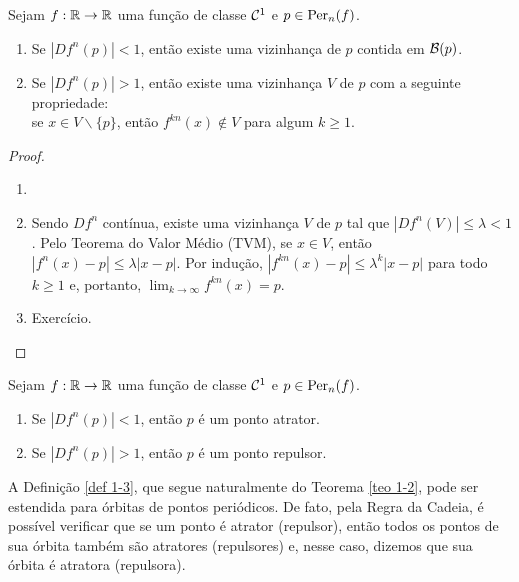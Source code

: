 \begin{theorem}\label{teo 1-2}
Sejam $f: \mathbb{R} \to \mathbb{R}$ uma função de classe $\mathcal{C}^1$ e $p \in \operatorname{Per}_n(f)$.
\begin{enumerate}
\item Se $|D f^n(p)| < 1$, então existe uma vizinhança de $p$ contida em $\mathcal{B}(p)$.
\item Se $|D f^n(p)| > 1$, então existe uma vizinhança $V$ de $p$ com a seguinte propriedade:\\se $x \in V \backslash \lbrace p \rbrace$, então  $f^{kn}(x) \notin V$ para algum $k \geq 1$. 
\end{enumerate}
\end{theorem}

\begin{proof}
\begin{enumerate}\item[]
\item Sendo $D f^n$ contínua, existe uma vizinhança $V$ de $p$ tal que $|D f^n(V)| \leq \lambda < 1$.
Pelo Teorema do Valor Médio (TVM), se $x \in V$, então $|f^n(x) - p| \leq \lambda|x - p|$.
Por indução, $|f^{kn}(x) - p| \leq \lambda^k|x - p|$ para todo $k \geq 1$ e, portanto, $\lim_{k \to \infty} f^{kn}(x) = p$.
\item Exercício.
\end{enumerate}
\end{proof}



\begin{definition}\label{def 1-3}
Sejam $f: \mathbb{R} \to \mathbb{R}$ uma função de classe $\mathcal{C}^1$ e $p \in \operatorname{Per}_n(f)$.
\begin{enumerate}[label=\roman*.]
\item Se $|D f^n(p)| < 1$, então $p$ é um ponto atrator.
\item Se $|D f^n(p)| > 1$, então $p$ é um ponto repulsor.
\end{enumerate}
\end{definition}

A Definição \ref{def 1-3}, que segue naturalmente do Teorema \ref{teo 1-2}, pode ser estendida para órbitas de pontos periódicos. De fato, pela Regra da Cadeia, é possível verificar que se um ponto é atrator (repulsor), então todos os pontos de sua órbita também são atratores (repulsores) e, nesse caso, dizemos que sua órbita é atratora (repulsora).

